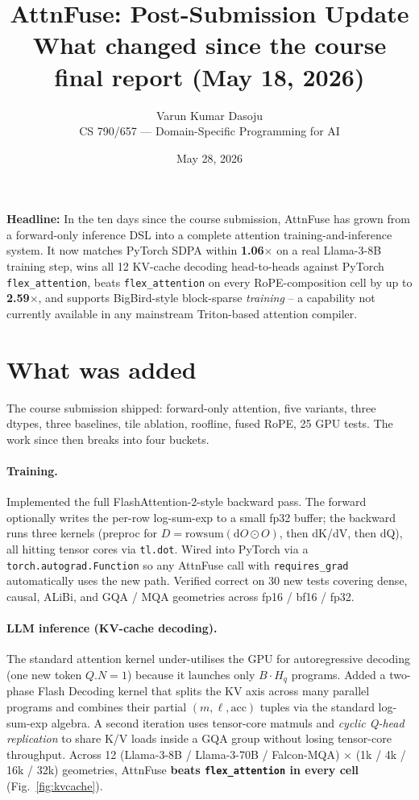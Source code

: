 \documentclass[11pt]{article}
\title{\textbf{AttnFuse: Post-Submission Update}\\[4pt]
       \large What changed since the course final report (May 18, 2026)}
\author{Varun Kumar Dasoju \\ \small CS 790/657 --- Domain-Specific Programming for AI}
\date{May 28, 2026}
\begin{document}
\maketitle

\begin{takeaway}
\textbf{Headline:} In the ten days since the course submission, AttnFuse
has grown from a forward-only inference DSL into a complete attention
training-and-inference system. It now matches PyTorch SDPA within
\textbf{1.06$\times$} on a real Llama-3-8B training step, wins all 12
KV-cache decoding head-to-heads against PyTorch \texttt{flex\_attention},
beats \texttt{flex\_attention} on every RoPE-composition cell by up to
\textbf{2.59$\times$}, and supports BigBird-style block-sparse
\emph{training} -- a capability not currently available in any
mainstream Triton-based attention compiler.
\end{takeaway}

\section{What was added}

The course submission shipped: forward-only attention, five variants,
three dtypes, three baselines, tile ablation, roofline, fused RoPE,
25 GPU tests. The work since then breaks into four buckets.

\paragraph{Training.} Implemented the full FlashAttention-2-style
backward pass. The forward optionally writes the per-row log-sum-exp
to a small fp32 buffer; the backward runs three kernels (preproc for
$D = \mathrm{rowsum}(\mathrm{d}O \odot O)$, then dK/dV, then dQ), all
hitting tensor cores via \texttt{tl.dot}. Wired into PyTorch via a
\texttt{torch.autograd.Function} so any AttnFuse call with
\texttt{requires\_grad} automatically uses the new path. Verified
correct on 30 new tests covering dense, causal, ALiBi, and GQA / MQA
geometries across fp16 / bf16 / fp32.

\paragraph{LLM inference (KV-cache decoding).} The standard attention
kernel under-utilises the GPU for autoregressive decoding (one new
token $Q.N=1$) because it launches only $B \cdot H_q$ programs. Added
a two-phase Flash Decoding kernel that splits the KV axis across many
parallel programs and combines their partial $(m, \ell, \mathrm{acc})$
tuples via the standard log-sum-exp algebra. A second iteration uses
tensor-core matmuls and \emph{cyclic Q-head replication} to share K/V
loads inside a GQA group without losing tensor-core throughput. Across
12 (Llama-3-8B / Llama-3-70B / Falcon-MQA) $\times$ (1k / 4k / 16k / 32k)
geometries, AttnFuse \textbf{beats \texttt{flex\_attention} in every
cell} (Fig.~\ref{fig:kvcache}).
\end{document}
